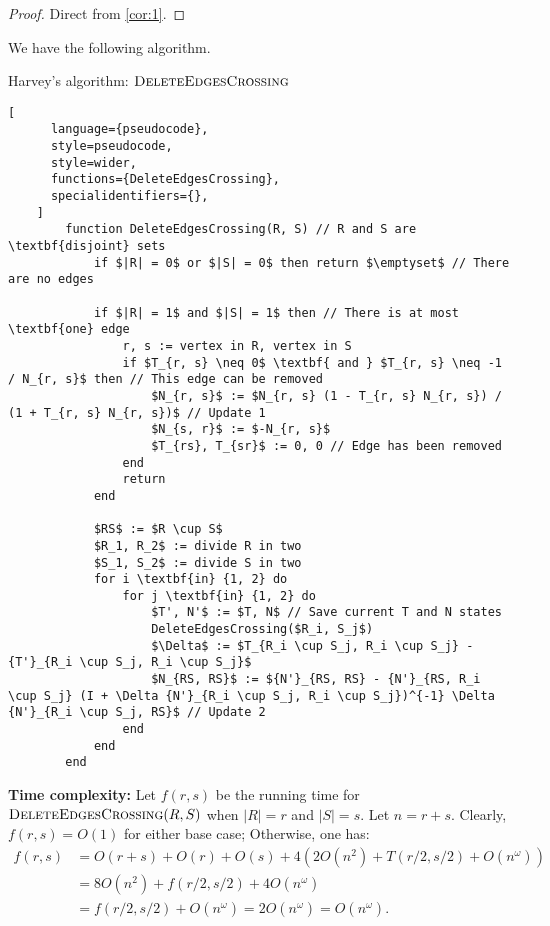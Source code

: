 \begin{proof}
    Direct from \ref{cor:1}.
\end{proof}

We have the following algorithm.

\begin{programruledcaption}{Harvey's algorithm: \(\textsc{DeleteEdgesCrossing}\)}
    \begin{lstlisting}[
      language={pseudocode},
      style=pseudocode,
      style=wider,
      functions={DeleteEdgesCrossing},
      specialidentifiers={},
    ]
        function DeleteEdgesCrossing(R, S) // R and S are \textbf{disjoint} sets
            if $|R| = 0$ or $|S| = 0$ then return $\emptyset$ // There are no edges

            if $|R| = 1$ and $|S| = 1$ then // There is at most \textbf{one} edge
                r, s := vertex in R, vertex in S
                if $T_{r, s} \neq 0$ \textbf{ and } $T_{r, s} \neq -1 / N_{r, s}$ then // This edge can be removed
                    $N_{r, s}$ := $N_{r, s} (1 - T_{r, s} N_{r, s}) / (1 + T_{r, s} N_{r, s})$ // Update 1
                    $N_{s, r}$ := $-N_{r, s}$
                    $T_{rs}, T_{sr}$ := 0, 0 // Edge has been removed
                end
                return
            end

            $RS$ := $R \cup S$
            $R_1, R_2$ := divide R in two 
            $S_1, S_2$ := divide S in two
            for i \textbf{in} {1, 2} do
                for j \textbf{in} {1, 2} do
                    $T', N'$ := $T, N$ // Save current T and N states
                    DeleteEdgesCrossing($R_i, S_j$)
                    $\Delta$ := $T_{R_i \cup S_j, R_i \cup S_j} - {T'}_{R_i \cup S_j, R_i \cup S_j}$
                    $N_{RS, RS}$ := ${N'}_{RS, RS} - {N'}_{RS, R_i \cup S_j} (I + \Delta {N'}_{R_i \cup S_j, R_i \cup S_j})^{-1} \Delta {N'}_{R_i \cup S_j, RS}$ // Update 2
                end
            end
        end
    \end{lstlisting}
\end{programruledcaption}

\textbf{Time complexity:} Let \(f(r, s)\) be the running time for \(\textsc{DeleteEdgesCrossing}(R, S)\) when \(|R| = r\) and \(|S| = s\).
Let \(n = r + s\). Clearly, \(f(r, s) = O(1)\) for either base case;
Otherwise, one has:
\begin{align}
    f(r, s) &= O(r + s) + O(r) + O(s) + 4(2O(n^2) + T(r / 2, s / 2) + O(n^\omega))  \\
    &= 8O(n^2) + f(r / 2, s / 2) + 4O(n^\omega) \\
    &= f(r / 2, s / 2) + O(n^\omega) = 2O(n^\omega) = O(n^\omega). \label{alg:delcrossing}
\end{align}


